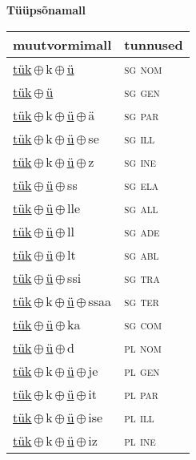 

\vspace{3.5em}
\noindent \begin{minipage}{\textwidth}
\noindent \textbf{Tüüpsõnamall \,}\\

\begin{sideways}
\begin{tabular}{l l}
muutvormimall & tunnused \\
\hline
\underline{tük}\,$\oplus$\,k\,$\oplus$\,\underline{ü} & \textsc{ sg nom } \\
\underline{tük}\,$\oplus$\,\underline{ü} & \textsc{ sg gen } \\
\underline{tük}\,$\oplus$\,k\,$\oplus$\,\underline{ü}\,$\oplus$\,ä & \textsc{ sg par } \\
\underline{tük}\,$\oplus$\,k\,$\oplus$\,\underline{ü}\,$\oplus$\,se & \textsc{ sg ill } \\
\underline{tük}\,$\oplus$\,k\,$\oplus$\,\underline{ü}\,$\oplus$\,z & \textsc{ sg ine } \\
\underline{tük}\,$\oplus$\,\underline{ü}\,$\oplus$\,ss & \textsc{ sg ela } \\
\underline{tük}\,$\oplus$\,\underline{ü}\,$\oplus$\,lle & \textsc{ sg all } \\
\underline{tük}\,$\oplus$\,\underline{ü}\,$\oplus$\,ll & \textsc{ sg ade } \\
\underline{tük}\,$\oplus$\,\underline{ü}\,$\oplus$\,lt & \textsc{ sg abl } \\
\underline{tük}\,$\oplus$\,\underline{ü}\,$\oplus$\,ssi & \textsc{ sg tra } \\
\underline{tük}\,$\oplus$\,k\,$\oplus$\,\underline{ü}\,$\oplus$\,ssaa & \textsc{ sg ter } \\
\underline{tük}\,$\oplus$\,\underline{ü}\,$\oplus$\,ka & \textsc{ sg com } \\
\underline{tük}\,$\oplus$\,\underline{ü}\,$\oplus$\,d & \textsc{ pl nom } \\
\underline{tük}\,$\oplus$\,k\,$\oplus$\,\underline{ü}\,$\oplus$\,je & \textsc{ pl gen } \\
\underline{tük}\,$\oplus$\,k\,$\oplus$\,\underline{ü}\,$\oplus$\,it & \textsc{ pl par } \\
\underline{tük}\,$\oplus$\,k\,$\oplus$\,\underline{ü}\,$\oplus$\,ise & \textsc{ pl ill } \\
\underline{tük}\,$\oplus$\,k\,$\oplus$\,\underline{ü}\,$\oplus$\,iz & \textsc{ pl ine } \\

\end{tabular}
\end{sideways}
\end{minipage}
